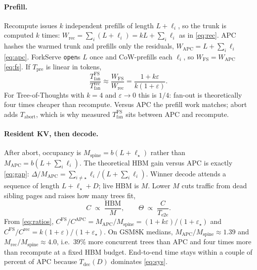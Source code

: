 \documentclass[11pt,a4paper]{article}
\begin{document}
\paragraph{Prefill.}
Recompute issues $k$ independent prefills of length $L+\ell_i$, so the trunk is computed $k$ times:
$W_{\mathrm{rec}}=\sum_i(L+\ell_i)=kL+\sum_i\ell_i$ as in \eqref{eq:rec}.
APC hashes the warmed trunk and prefills only the residuals, $W_{\mathrm{APC}}=L+\sum_i\ell_i$ \eqref{eq:apc}.
ForkServe \texttt{open}s $L$ once and CoW-prefills each $\ell_i$, so $W_{\mathrm{FS}}=W_{\mathrm{APC}}$ \eqref{eq:fs}.
If $T_{\mathrm{pre}}$ is linear in tokens,
\begin{equation}
\label{eq:tfan}
\frac{T_{\mathrm{fan}}^{\mathrm{FS}}}{T_{\mathrm{fan}}^{\mathrm{rec}}}
  \approx
\frac{W_{\mathrm{FS}}}{W_{\mathrm{rec}}}
  =\frac{1+k\varepsilon}{k(1+\varepsilon)}.
\end{equation}
For Tree-of-Thoughts with $k{=}4$ and $\varepsilon\to 0$ this is $1/4$: fan-out is theoretically four times cheaper than recompute.
Versus APC the prefill work matches; abort adds $T_{\mathrm{abort}}$, which is why measured $T_{\mathrm{fan}}^{\mathrm{FS}}$ sits between APC and recompute.

\paragraph{Resident KV, then decode.}
After abort, occupancy is $M_{\mathrm{spine}}=b(L+\ell_{\star})$ rather than $M_{\mathrm{APC}}=b(L+\sum_i\ell_i)$.
The theoretical HBM gain versus APC is exactly \eqref{eq:gap}:
$\Delta/M_{\mathrm{APC}}=\sum_{i\neq\star}\ell_i\big/(L+\sum_i\ell_i)$.
Winner decode attends a sequence of length $L+\ell_{\star}+D$; live HBM is $M$.
Lower $M$ cuts traffic from dead sibling pages and raises how many trees fit,
\begin{equation}
\label{eq:conc}
C
  \;\propto\;
  \frac{\mathrm{HBM}}{M},
\qquad
\Theta
  \;\propto\;
  \frac{C}{T_{\mathrm{e2e}}}.
\end{equation}
From \eqref{eq:ratios}, $C^{\mathrm{FS}}/C^{\mathrm{APC}}=M_{\mathrm{APC}}/M_{\mathrm{spine}}=(1+k\varepsilon)/(1+\varepsilon_{\star})$
and $C^{\mathrm{FS}}/C^{\mathrm{rec}}=k(1+\varepsilon)/(1+\varepsilon_{\star})$.
On GSM8K medians, $M_{\mathrm{APC}}/M_{\mathrm{spine}}\approx 1.39$ and $M_{\mathrm{rec}}/M_{\mathrm{spine}}\approx 4.0$,
i.e.\ $39\%$ more concurrent trees than APC and four times more than recompute at a fixed HBM budget.
End-to-end time stays within a couple of percent of APC because $T_{\mathrm{dec}}(D)$ dominates \eqref{eq:sys}.
\end{document}
